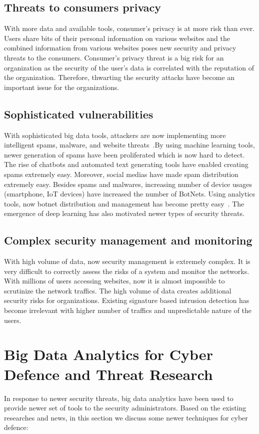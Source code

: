 \documentclass[sigconf]{acmart}
\begin{document}
\subsection{Threats to consumers privacy}
With more data and available tools, consumer's privacy is at more risk than ever. Users share bits of their personal information on various websites and the combined information from various websites poses new security and privacy threats to the consumers. Consumer's privacy threat is a big risk for an organization as the security of the user's data is correlated with the reputation of the organization. Therefore, thwarting the security attacks have become an important issue for the organizations.

\subsection{Sophisticated vulnerabilities}
With sophisticated big data tools, attackers are now implementing more intelligent spams, malware, and website threats~\cite{Mahmood:2013}.By using machine learning tools, newer generation of spams have been proliferated which is now hard to detect. The rise of chatbots and automated text generating tools have enabled creating spams extremely easy. Moreover, social medias have made spam distribution extremely easy. Besides spams and malwares, increasing number of device usages (smartphone, IoT devices) have increased the number of BotNets. Using analytics tools, now botnet distribution and management has become pretty easy~\cite{Gahi:2016,SINGH:2014}. The emergence of deep learning has also motivated newer types of security threats. 

\subsection{Complex security management and monitoring}
With high volume of data, now security management is extremely complex. It is very difficult to correctly assess the risks of a system and monitor the networks. With millions of users accessing websites, now it is almost impossible to scrutinize the network traffics. The high volume of data creates additional security risks for organizations. Existing signature based intrusion detection has become irrelevant with higher number of traffics and unpredictable nature of the users. 


\section{Big Data Analytics for Cyber Defence and Threat Research}
In response to newer security threats, big data analytics have been used to provide newer set of tools to the security administrators. Based on the existing researches and news, in this section we discuss some newer techniques for cyber defence:
\end{document}
